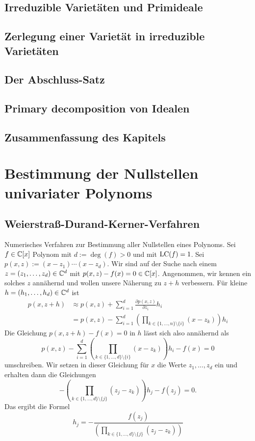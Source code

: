 \documentclass[11pt]{article}
\numberwithin{equation}{section}
\begin{document}
\subsection{Irreduzible Varietäten und Primideale}

\subsection{Zerlegung einer Varietät in irreduzible Varietäten} 

\subsection{Der Abschluss-Satz} 

\subsection{Primary decomposition von Idealen}

\subsection{Zusammenfassung des Kapitels}



\appendix 

\section{Bestimmung  der Nullstellen univariater Polynoms}

\subsection{Weierstraß-Durand-Kerner-Verfahren} 

Numerisches Verfahren zur Bestimmung aller Nullstellen eines Polynoms. Sei $f \in \mathbb{C}[x]$ Polynom mit $d := \deg (f) > 0$ und mit $\operatorname{LC}(f)=1$. Sei $p(x,z) := (x- z_1) \cdots (x - z_d)$. Wir sind auf der Suche nach einem $z=(z_1,\ldots,z_d) \in \mathbb{C}^d$ mit $p(x,z) - f(x) = 0 \in \mathbb{C}[x]$. Angenommen, wir kennen ein solches $z$ annähernd und wollen unsere Näherung zu $z+h$ verbessern. Für kleine $h = (h_1,\ldots,h_d) \in \mathbb{C}^d$ ist 
\begin{align*}
	p(x,z+h) & \approx  p(x,z) + \sum_{i=1}^d \frac{\partial p(x,z)}{\partial z_i} h_i
				\\ & = p(x,z) - \sum_{i=1}^d  \left(\prod_{k \in \{1,\ldots,n\} \setminus \{i\}} (x-z_k) \right) h_i
\end{align*}
Die Gleichung $p(x,z+h) - f(x) =0$ in $h$ lässt sich also annähernd als 
\[
	p(x,z) - \sum_{i=1}^d \left(\prod_{k \in \{1,\ldots,d\} \setminus \{i\}} (x-z_k) \right) h_i - f(x) = 0
\]
umschreiben. Wir setzen in dieser Gleichung für $x$ die Werte $z_1,\ldots,z_d$ ein und erhalten dann die Gleichungen 
\[
	 - \left(\prod_{k \in \{1,\ldots,d\} \setminus \{j\}} (z_j-z_k) \right) h_j - f(z_j) = 0.
\]
Das ergibt die Formel
\[
	h_j = - \frac{f(z_j)}{  \left(\prod_{k \in \{1,\ldots,d\} \setminus \{j\}} (z_j-z_k) \right) } 
\]
\end{document}
